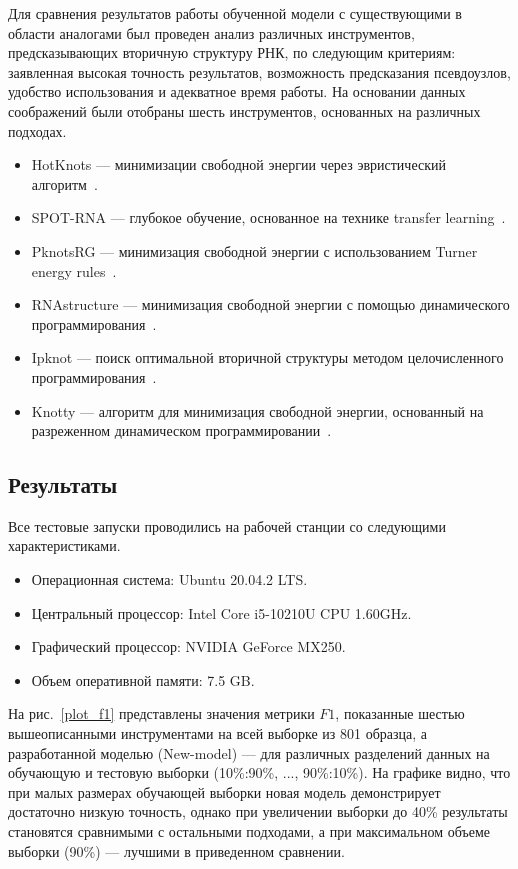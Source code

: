 Для сравнения результатов работы обученной модели с существующими в области аналогами был проведен анализ различных инструментов, предсказывающих вторичную структуру РНК, по следующим критериям: заявленная высокая точность результатов, возможность предсказания псевдоузлов, удобство использования и адекватное время работы. На основании данных соображений были отобраны шесть инструментов, основанных на различных подходах.
\begin{itemize}
    \item HotKnots --- минимизации свободной энергии через эвристический алгоритм~\cite{ren2005hotknots}.
    \item SPOT-RNA --- глубокое обучение, основанное на технике transfer learning~\cite{singh2019rna}.
    \item PknotsRG --- минимизация свободной энергии с использованием Turner energy rules~\cite{reeder2007pknotsrg}.
    \item RNAstructure --- минимизация свободной энергии с помощью динамического программирования~\cite{bellaousov2013rnastructure}.
    \item Ipknot --- поиск оптимальной вторичной структуры методом целочисленного программирования~\cite{sato2011ipknot}.
    \item Knotty --- алгоритм для минимизация свободной энергии, основанный на разреженном динамическом программировании~\cite{jabbari2018knotty}.
\end{itemize}

\subsection{Результаты}
Все тестовые запуски проводились на рабочей станции со следующими характеристиками.
\begin{itemize}
    \item Операционная система: Ubuntu 20.04.2 LTS.
    \item Центральный процессор: Intel Core i5-10210U CPU 1.60GHz.
    \item Графический процессор: NVIDIA GeForce MX250.
    \item Объем оперативной памяти: 7.5 GB.
\end{itemize}

На рис.~\ref{plot_f1} представлены значения метрики $F1$, показанные шестью вышеописанными инструментами на всей выборке из 801 образца, а разработанной моделью (New-model) --- для различных разделений данных на обучающую и тестовую выборки (10\%:90\%, ..., 90\%:10\%). На графике видно, что при малых размерах обучающей выборки новая модель демонстрирует достаточно низкую точность, однако при увеличении выборки до 40\% результаты становятся сравнимыми с остальными подходами, а при максимальном объеме выборки (90\%) ---  лучшими в приведенном сравнении.

